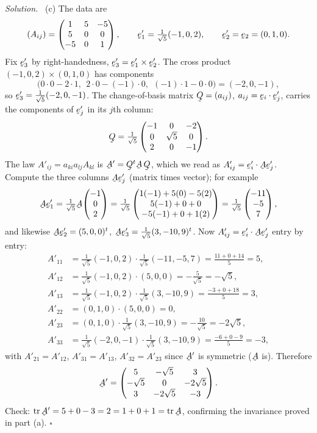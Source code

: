 \documentclass[17pt,a4paper]{extreport}
\DeclareRobustCommand{\vek}[1]{\underaccent{\tilde}{#1}}
\newcommand{\tr}{\operatorname{tr}}
\newcommand{\be}{\vek{e}}
\newcommand{\bA}{\vek{A}}
\newcommand{\bQ}{\vek{Q}}
\newcommand{\ip}[2]{#1\cdot#2}
\theoremstyle{scplain}
\theoremstyle{scdefn}
\theoremstyle{scplain}
\newenvironment{solution}
 {\par\smallskip\noindent\textit{Solution.}\ }
 {\hfill$\square$\par\medskip}
\begin{document}
\begin{solution}
(c) The data are
\[
(A_{ij})=\begin{pmatrix}1&5&-5\\5&0&0\\-5&0&1\end{pmatrix},\qquad
\be'_1=\tfrac1{\sqrt5}(-1,0,2),\qquad \be'_2=\be_2=(0,1,0).
\]
Fix $\be'_3$ by right-handedness, $\be'_3=\be'_1\times\be'_2$. The cross
product $(-1,0,2)\times(0,1,0)$ has components
\[
\big(0\cdot0-2\cdot1,\ \ 2\cdot0-(-1)\cdot0,\ \ (-1)\cdot1-0\cdot0\big)
=(-2,0,-1),
\]
so $\be'_3=\tfrac1{\sqrt5}(-2,0,-1)$. The change-of-basis matrix
$\bQ=(a_{ij})$, $a_{ij}=\ip{\be_i}{\be'_j}$, carries the components of
$\be'_j$ in its $j$th column:
\[
\bQ=\tfrac1{\sqrt5}\begin{pmatrix}-1&0&-2\\0&\sqrt5&0\\2&0&-1\end{pmatrix}.
\]
The law $A'_{ij}=a_{ki}a_{lj}A_{kl}$ is $\bA'=\bQ^{t}\bA\,\bQ$, which we read
as $A'_{ij}=\ip{\be'_i}{\bA\be'_j}$. Compute the three columns $\bA\be'_j$
(matrix times vector); for example
\[
\bA\be'_1=\tfrac1{\sqrt5}\bA\!\begin{pmatrix}-1\\0\\2\end{pmatrix}
=\tfrac1{\sqrt5}\begin{pmatrix}1(-1)+5(0)-5(2)\\5(-1)+0+0\\-5(-1)+0+1(2)\end{pmatrix}
=\tfrac1{\sqrt5}\begin{pmatrix}-11\\-5\\7\end{pmatrix},
\]
and likewise
$\bA\be'_2=(5,0,0)^t$,
$\bA\be'_3=\tfrac1{\sqrt5}(3,-10,9)^t$. Now
$A'_{ij}=\ip{\be'_i}{\bA\be'_j}$ entry by entry:
\[
\begin{aligned}
A'_{11}&=\tfrac1{\sqrt5}(-1,0,2)\!\cdot\!\tfrac1{\sqrt5}(-11,-5,7)
=\tfrac{11+0+14}{5}=5,\\
A'_{12}&=\tfrac1{\sqrt5}(-1,0,2)\!\cdot\!(5,0,0)=-\tfrac{5}{\sqrt5}=-\sqrt5,\\
A'_{13}&=\tfrac1{\sqrt5}(-1,0,2)\!\cdot\!\tfrac1{\sqrt5}(3,-10,9)
=\tfrac{-3+0+18}{5}=3,\\
A'_{22}&=(0,1,0)\!\cdot\!(5,0,0)=0,\\
A'_{23}&=(0,1,0)\!\cdot\!\tfrac1{\sqrt5}(3,-10,9)=-\tfrac{10}{\sqrt5}=-2\sqrt5,\\
A'_{33}&=\tfrac1{\sqrt5}(-2,0,-1)\!\cdot\!\tfrac1{\sqrt5}(3,-10,9)
=\tfrac{-6+0-9}{5}=-3,
\end{aligned}
\]
with $A'_{21}=A'_{12}$, $A'_{31}=A'_{13}$, $A'_{32}=A'_{23}$ since $\bA'$ is
symmetric ($\bA$ is). Therefore
\[
\bA'=\begin{pmatrix}5&-\sqrt5&3\\-\sqrt5&0&-2\sqrt5\\3&-2\sqrt5&-3\end{pmatrix}.
\]
Check: $\tr\bA'=5+0-3=2=1+0+1=\tr\bA$, confirming the invariance proved in
part (a).
\end{solution}
\end{document}
